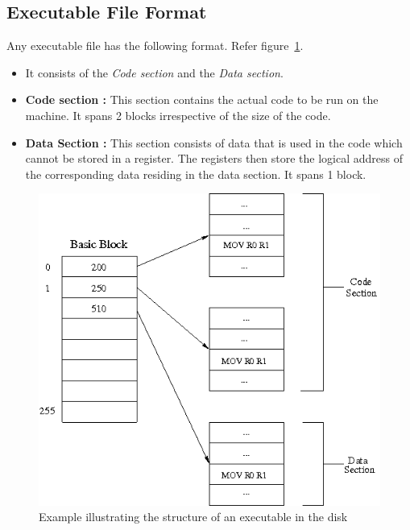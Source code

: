 \subsection{Executable File Format}
Any executable file has the following format. Refer figure~\ref{fig:executable}.
\begin{itemize}
	\item  It consists of the \emph{Code section} and the \emph{Data section}.
	\item \textbf{Code section :} This section contains the actual code to be run on the machine. It spans 2 blocks irrespective of the size of the code.
	\item \textbf{Data Section :} This section consists of data that is used in the code which cannot be stored in a register. The registers then store the logical address of the corresponding data residing in the data section. It spans 1 block. 
\end{itemize}
	
\begin{figure}[h!]
	\centering
	\includegraphics[scale=0.60]{pics/executable}
	\caption{Example illustrating the structure of an executable in the disk}
	\label{fig:executable}
\end{figure}

